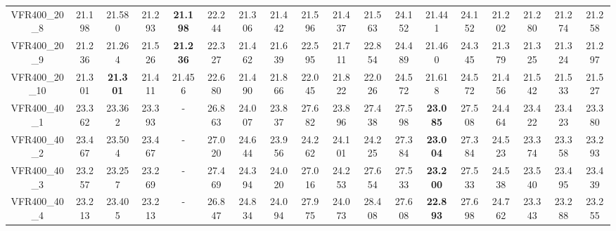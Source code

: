 \begin{tabular}{cc|ccc|ccccccccccccc}
VFR400\_20\_8      & 21.198           & 21.580           & 21.293           & {\bf 21.198}     & 22.244           & 21.306           & 21.442           & 21.596           & 21.437           & 21.563           & 24.152           & 21.441           & 24.152           & 21.202           & 21.280           & 21.274           & 21.258          \\ 
VFR400\_20\_9      & 21.236           & 21.264           & 21.526           & {\bf 21.236}     & 22.327           & 21.462           & 21.639           & 22.595           & 21.711           & 22.854           & 24.489           & 21.460           & 24.345           & 21.379           & 21.325           & 21.324           & 21.297          \\ 
VFR400\_20\_10     & 21.301           & {\bf 21.301}     & 21.411           & 21.456           & 22.680           & 21.490           & 21.866           & 22.045           & 21.822           & 22.026           & 24.572           & 21.618           & 24.572           & 21.456           & 21.542           & 21.533           & 21.527          \\ 
VFR400\_40\_1      & 23.362           & 23.362           & 23.393           & -                & 26.863           & 24.007           & 23.837           & 27.682           & 23.896           & 27.438           & 27.598           & {\bf 23.085}     & 27.508           & 24.464           & 23.422           & 23.423           & 23.380          \\ 
VFR400\_40\_2      & 23.467           & 23.504           & 23.467           & -                & 27.020           & 24.644           & 23.956           & 24.262           & 24.101           & 24.225           & 27.384           & {\bf 23.004}     & 27.384           & 24.523           & 23.374           & 23.358           & 23.293          \\ 
VFR400\_40\_3      & 23.257           & 23.257           & 23.269           & -                & 27.469           & 24.394           & 24.020           & 27.016           & 24.253           & 27.654           & 27.533           & {\bf 23.200}     & 27.533           & 24.538           & 23.540           & 23.495           & 23.439          \\ 
VFR400\_40\_4      & 23.213           & 23.405           & 23.213           & -                & 26.847           & 24.834           & 24.094           & 27.975           & 24.073           & 28.408           & 27.608           & {\bf 22.893}     & 27.698           & 24.762           & 23.343           & 23.288           & 23.255          \\ 

\end{tabular}
